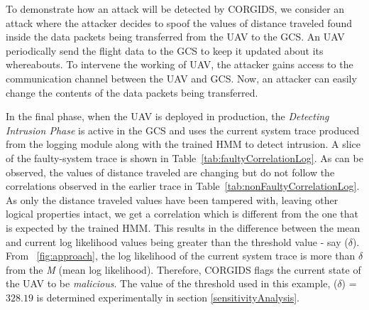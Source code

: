 To demonstrate how an attack will be detected by \ac{CORGIDS}, we consider an attack where the attacker decides to spoof the values of distance traveled found inside the data packets being transferred from the \ac{UAV} to the \ac{GCS}. An \ac{UAV} periodically send the flight data to the \ac{GCS} to keep it updated about its whereabouts. To intervene the working of \ac{UAV}, the attacker gains access to the communication channel between the \ac{UAV} and \ac{GCS}. Now, an attacker can easily change the contents of the data packets being transferred.

In the final phase, when the \ac{UAV} is deployed in production, the \textit{Detecting Intrusion Phase} is active in the \ac{GCS} and uses the current system trace produced from the logging module along with the trained HMM to detect intrusion. A slice of the faulty-system trace is shown in Table~\ref{tab:faultyCorrelationLog}. As can be observed, the values of distance traveled are changing but do not follow the correlations observed in the earlier trace in Table~\ref{tab:nonFaultyCorrelationLog}. As only the distance traveled values have been tampered with, leaving other logical properties intact, we get a correlation which is different from the one that is expected by the trained \ac{HMM}. This results in the difference between the mean and current log likelihood values being greater than the threshold value - say ($\delta$). From ~\autoref{fig:approach}, the log likelihood of the current system trace is more than $\delta$ from the \textit{M} (mean log likelihood). Therefore, \ac{CORGIDS} flags the current state of the \ac{UAV} to be \textit{malicious}. The value of the threshold used in this example, ($\delta$) = $328.19$ is determined experimentally in section \ref{sensitivityAnalysis}. 


\endinput
=====================================================================
